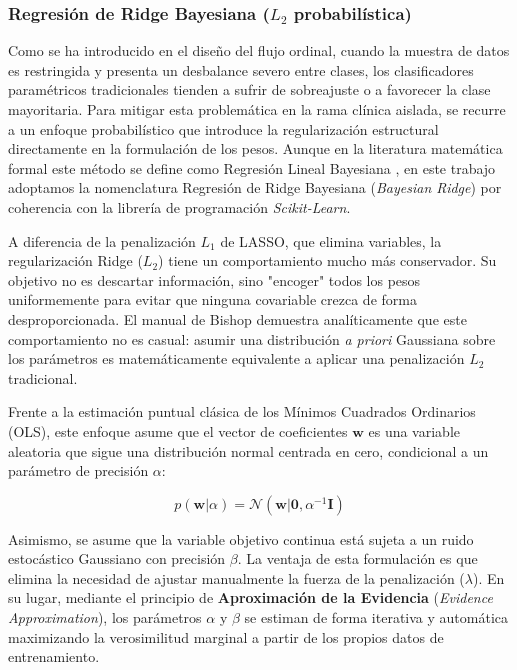\documentclass[12pt, oneside, english, spanish]{book}
\begin{document}
\subsubsection{Regresión de Ridge Bayesiana ($L_2$ probabilística)} \label{subsubsec:teoria_bayesian_ridge}

Como se ha introducido en el diseño del flujo ordinal, cuando la muestra de datos es restringida y presenta un desbalance severo entre clases, los clasificadores paramétricos tradicionales tienden a sufrir de sobreajuste o a favorecer la clase mayoritaria. Para mitigar esta problemática en la rama clínica aislada, se recurre a un enfoque probabilístico que introduce la regularización estructural directamente en la formulación de los pesos. Aunque en la literatura matemática formal este método se define como Regresión Lineal Bayesiana \cite{bishop2006pattern}, en este trabajo adoptamos la nomenclatura Regresión de Ridge Bayesiana (\textit{Bayesian Ridge}) por coherencia con la librería de programación \textit{Scikit-Learn}.

A diferencia de la penalización $L_1$ de LASSO, que elimina variables, la regularización Ridge ($L_2$) tiene un comportamiento mucho más conservador. Su objetivo no es descartar información, sino "encoger" todos los pesos uniformemente para evitar que ninguna covariable crezca de forma desproporcionada. El manual de Bishop \cite{bishop2006pattern} demuestra analíticamente que este comportamiento no es casual: asumir una distribución \textit{a priori} Gaussiana sobre los parámetros es matemáticamente equivalente a aplicar una penalización $L_2$ tradicional.

Frente a la estimación puntual clásica de los Mínimos Cuadrados Ordinarios (OLS), este enfoque asume que el vector de coeficientes $\mathbf{w}$ es una variable aleatoria que sigue una distribución normal centrada en cero, condicional a un parámetro de precisión $\alpha$:

\begin{equation}
	p(\mathbf{w}|\alpha) = \mathcal{N}(\mathbf{w}|\mathbf{0}, \alpha^{-1}\mathbf{I})
\end{equation}

Asimismo, se asume que la variable objetivo continua está sujeta a un ruido estocástico Gaussiano con precisión $\beta$. La ventaja de esta formulación es que elimina la necesidad de ajustar manualmente la fuerza de la penalización ($\lambda$). En su lugar, mediante el principio de \textbf{Aproximación de la Evidencia} (\textit{Evidence Approximation}), los parámetros $\alpha$ y $\beta$ se estiman de forma iterativa y automática maximizando la verosimilitud marginal a partir de los propios datos de entrenamiento.
\end{document}
